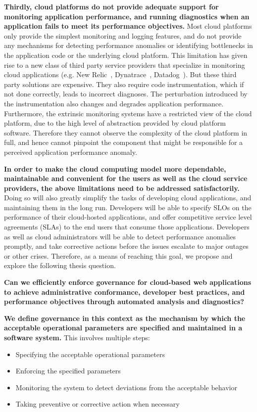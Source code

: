 \textbf{Thirdly, cloud platforms do not provide adequate support for monitoring application performance,
and running diagnostics when an application fails to meet its performance objectives.} 
Most cloud platforms only provide the simplest monitoring and logging features,
and do not provide any mechanisms for detecting performance anomalies or identifying
bottlenecks in the application code or the underlying cloud platform. This limitation has given rise
to a new class of third party service providers that specialize in monitoring cloud applications
(e.g. New Relic~\cite{newrelic}, Dynatrace~\cite{dynatrace}, Datadog~\cite{datadog}). But these 
third party solutions are expensive. They also require code instrumentation, which
if not done correctly, leads to incorrect diagnoses. The perturbation
introduced by the instrumentation also changes and degrades application performance.
Furthermore, the extrinsic monitoring systems have a restricted view 
of the cloud platform, due to the high level of abstraction provided by cloud platform software.
Therefore they cannot observe the complexity of the cloud platform in full, and hence cannot pinpoint
the component that might be responsible for a perceived application performance anomaly.

\textbf{In order to make the cloud computing model more dependable, maintainable and convenient for the users as well
as the cloud service providers, the above limitations need to be addressed satisfactorily.}
Doing so will also greatly simplify the tasks of developing cloud applications, and maintaining 
them in the long run. Developers will be able to specify SLOs on the performance of
their cloud-hosted applications, and offer competitive service level agreements (SLAs) to the end users that consume those
applications. Developers as well as cloud administrators will be able to detect performance anomalies
promptly, and take corrective actions before the issues escalate to major
outages or other crises. Therefore, as a means of reaching this goal, we propose and explore the
following thesis question.

{\bf Can we efficiently enforce governance for cloud-based web applications to achieve 
administrative conformance, developer best practices, and performance objectives through 
automated analysis and diagnostics?} 

\textbf{We define governance in this context as the mechanism by which the acceptable 
operational parameters are specified and maintained in a software system.} This involves 
multiple steps:
\begin{itemize}
\item Specifying the acceptable operational parameters
\item Enforcing the specified parameters
\item Monitoring the system to detect deviations from the acceptable behavior
\item Taking preventive or corrective action when necessary
\end{itemize}


